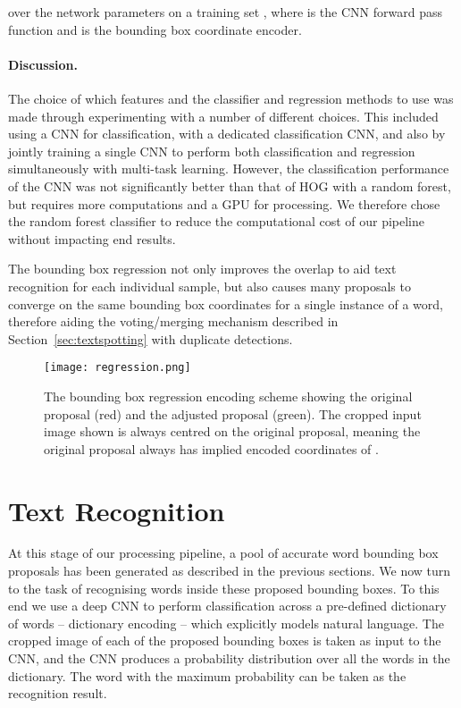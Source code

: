 \documentclass[twocolumn]{svjour3}          \smartqed  \usepackage{epsfig}
\begin{document}
over the network parameters  on a training set , where  is the CNN forward pass function and  is the bounding box coordinate encoder.

\paragraph{Discussion.}
The choice of which features and the classifier and regression methods to use was made through experimenting with a number of different choices. This included using a CNN for classification, with a dedicated classification CNN, and also by jointly training a single CNN to perform both classification and regression simultaneously with multi-task learning. However, the classification performance of the CNN was not significantly better than that of HOG with a random forest, but requires more computations and a GPU for processing. We therefore chose the random forest classifier to reduce the computational cost of our pipeline without impacting end results.

The bounding box regression not only improves the overlap to aid text recognition for each individual sample, but also causes many proposals to converge on the same bounding box coordinates for a single instance of a word, therefore aiding the voting/merging mechanism described in Section~\ref{sec:textspotting} with duplicate detections. 

\begin{figure}
\begin{center}
\texttt{[image: regression.png]} 
\caption{The bounding box regression encoding scheme showing the original proposal (red) and the adjusted proposal (green). The cropped input image shown is always centred on the original proposal, meaning the original proposal always has implied encoded coordinates of .}
\label{fig:encoding}
\end{center}
\end{figure}

 


\section{Text Recognition}
\label{sec:recognition}

At this stage of our processing pipeline, a pool of accurate word bounding box proposals has been generated as described in the previous sections. We now turn to the task of recognising words inside these proposed bounding boxes. To this end we use a deep CNN to perform classification across a pre-defined dictionary of words -- dictionary encoding -- which explicitly models natural language. The cropped image of each of the proposed bounding boxes is taken as input to the CNN, and the CNN produces a probability distribution over all the words in the dictionary. The word with the maximum probability can be taken as the recognition result. 
\end{document}
